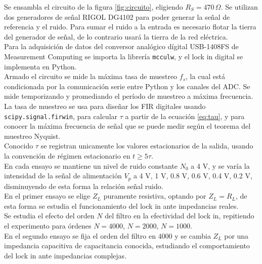 \documentclass[11pt,a4paper]{extarticle}
\begin{document}
\begin{multicols}{2}
Se ensambla el circuito de la figura \ref{fig:circuito}, eligiendo $R_S = 470 \, \Omega$. 
Se utilizan dos generadores de señal RIGOL DG4102 
para poder generar la señal de referencia y el ruido.
Para sumar el ruido a la entrada es necesario flotar la 
tierra del generador de señal, de lo contrario usará la tierra de la red eléctrica.\\

Para la adquisición de datos del conversor analógico dígital USB-1408FS de
Measurement Computing se importa la librería \texttt{mcculw}\cite{mcculw}, y el lock in digital se implementa en Python.\\

Armado el circuito se mide la máxima tasa de muestreo $f_s$, la cual está condicionada por la comunicación serie entre Python y los canales del ADC. 
Se mide temporizando y promediando el período de muestreo a máxima frecuencia.\\

La tasa de muestreo se usa para diseñar los FIR digitales usando \texttt{scipy.signal.firwin}, para calcular $\tau$ a partir de la ecuación \ref{eq:tau}, y para conocer la máxima frecuencia de señal que se puede medir según el teorema del muestreo Nyquist\cite{haykin_4}.\\


Conocido $\tau$ se registran unicamente los valores estacionarios de la salida, usando la convención de régimen estacionario en $t \ge 5\tau$.\\

En cada ensayo se mantiene un nivel de ruido constante $N_0$ a 4 V, y se varía la intensidad de la señal de alimentación $V_p$ a 4 V, 1 V, 0.8 V, 0.6 V, 0.4 V, 0.2 V, disminuyendo de esta forma la relación señal ruido.\\


En el primer ensayo se elige $Z_L$ puramente resistiva, optando por $Z_L = R_L$, de esta forma se
estudia el funcionamiento del lock in ante impedancias reales.\\ 

Se estudia el efecto del orden $N$ del filtro en la efectividad del lock in, repitiendo el experimento para órdenes $N=4000$, $N=2000$, $N=1000$.\\

En el segundo ensayo se fija el orden del filtro en $4000$ y se cambia $Z_L$ por una impedancia capacitiva de capacitancia conocida, estudiando el comportamiento del lock in ante impedancias complejas.\\


\end{multicols}
\end{document}

